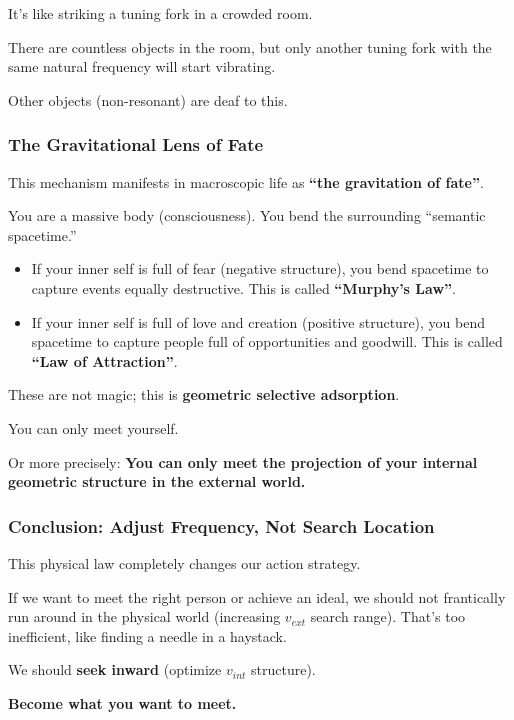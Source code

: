 It's like striking a tuning fork in a crowded room.

There are countless objects in the room, but only another tuning fork with the same natural frequency will start vibrating.

Other objects (non-resonant) are deaf to this.

\subsubsection{The Gravitational Lens of Fate}

This mechanism manifests in macroscopic life as \textbf{``the gravitation of fate''}.

You are a massive body (consciousness). You bend the surrounding ``semantic spacetime.''

\begin{itemize}
\item If your inner self is full of fear (negative structure), you bend spacetime to capture events equally destructive. This is called \textbf{``Murphy's Law''}.

\item If your inner self is full of love and creation (positive structure), you bend spacetime to capture people full of opportunities and goodwill. This is called \textbf{``Law of Attraction''}.
\end{itemize}

These are not magic; this is \textbf{geometric selective adsorption}.

You can only meet yourself.

Or more precisely: \textbf{You can only meet the projection of your internal geometric structure in the external world.}

\subsubsection{Conclusion: Adjust Frequency, Not Search Location}

This physical law completely changes our action strategy.

If we want to meet the right person or achieve an ideal, we should not frantically run around in the physical world (increasing $v_{ext}$ search range). That's too inefficient, like finding a needle in a haystack.

We should \textbf{seek inward} (optimize $v_{int}$ structure).

\textbf{Become what you want to meet.}

